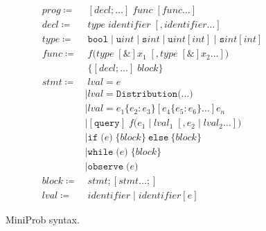 \documentclass[9pt,a4paper]{article}
\begin{document}
\begin{figure}
\begin{align*}
\mathit{prog} \coloneqq & \; [\mathit{decl} ; \dots] \; \mathit{func} \; [\mathit{func} \dots] \\
\mathit{decl} \coloneqq & \; \mathit{type \; identifier} \; [, \mathit{identifier} \dots] \\
\mathit{type} \coloneqq & \; \mathtt{bool} \mid \mathtt{u}\mathit{int} \mid \mathtt{s}\mathit{int} \mid \mathtt{u}\mathit{int}[\mathit{int}] \mid \mathtt{s}\mathit{int}[\mathit{int}] \\
\mathit{func} \coloneqq & \; f \texttt{(}\mathit{type} \; [\&] x_1 \; [, \mathit{type} \; [\&] x_2 \dots]\texttt{)} \\
  &\; \{ [\mathit{decl} ; \dots] \; \mathit{block} \} \\
\mathit{stmt} \coloneqq
    & \; \mathit{lval} = e \\
    &\mid \mathit{lval} = \mathtt{Distribution}\texttt{(} \dots \texttt{)} \\
    &\mid \mathit{lval} = e_1 \{ e_2 : e_3 \} [e_4 \{ e_5 : e_6 \} \dots] e_n \\
    &\mid [\texttt{query}] \; f\texttt{(}e_1 \mid \mathit{lval}_1 \; [, e_2 \mid \mathit{lval}_2 \dots]\texttt{)} \\
    &\mid \mathtt{if} \; \texttt{(}e\texttt{)} \; \{ \mathit{block} \} \ \mathtt{else} \ \{ \mathit{block} \} \\
    &\mid \mathtt{while} \; \texttt{(}e\texttt{)} \; \{ \mathit{block} \} \\
    &\mid \mathtt{observe} \; \texttt{(}e\texttt{)} \\
\mathit{block} \coloneqq & \; \mathit{stmt} ; [\mathit{stmt} \dots ; ] \\
\mathit{lval} \coloneqq & \; \mathit{identifier} \mid \mathit{identifier}[e]
\end{align*}
\caption{MiniProb syntax.}
\label{fig:miniprob}
\end{figure}
\end{document}
